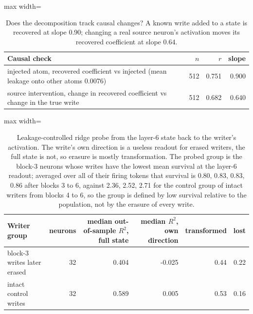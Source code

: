 \begin{table}[H]\centering\small
\caption{Does the decomposition track causal changes? A known write added to a state is recovered at slope 0.90; changing a real source neuron's activation moves its recovered coefficient at slope 0.64.}\label{app:causal}
\begin{adjustbox}{max width=\linewidth}
\begin{tabular}{lrrr}\toprule
Causal check & $n$ & $r$ & slope \\ \midrule
injected atom, recovered coefficient vs injected (mean leakage onto other atoms 0.0076) & 512 & 0.751 & 0.900 \\
source intervention, change in recovered coefficient vs change in the true write & 512 & 0.682 & 0.640 \\
\bottomrule\end{tabular}\end{adjustbox}
\end{table}
\begin{table}[H]\centering\footnotesize
\caption{Leakage-controlled ridge probe from the layer-6 state back to the writer's activation. The write's own direction is a useless readout for erased writers, the full state is not, so erasure is mostly transformation. The probed group is the block-3 neurons whose writes have the lowest mean survival at the layer-6 readout; averaged over all of their firing tokens that survival is 0.80, 0.83, 0.83, 0.86 after blocks 3 to 6, against 2.36, 2.52, 2.71 for the control group of intact writers from blocks 4 to 6, so the group is defined by low survival relative to the population, not by the erasure of every write.}\label{app:probe}
\begin{adjustbox}{max width=\linewidth}
\begin{tabular}{lrrrrr}\toprule
Writer group & neurons & median out-of-sample $R^2$, full state & median $R^2$, own direction & transformed & lost \\ \midrule
block-3 writes later erased & 32 & 0.404 & -0.025 & 0.44 & 0.22 \\
intact control writes & 32 & 0.589 & 0.005 & 0.53 & 0.16 \\
\bottomrule\end{tabular}\end{adjustbox}
\end{table}
